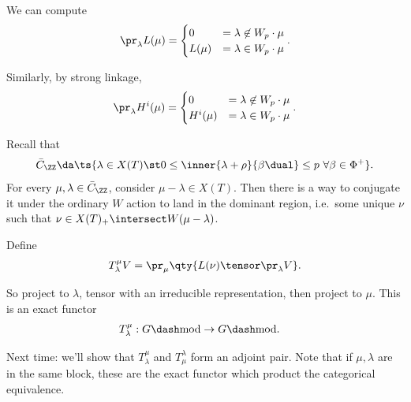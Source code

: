 \begin{example}

We can compute
\begin{align*}  
\pr_\lambda L(\mu) = 
\begin{cases}
0 &= \lambda \not\in W_p \cdot \mu \\
L(\mu) &= \lambda \in W_p \cdot \mu
\end{cases}
.\end{align*}

Similarly, by strong linkage,
\begin{align*}  
\pr_\lambda H^i(\mu) =
\begin{cases}
0 &= \lambda \not\in W_p \cdot \mu \\
H^i(\mu) &= \lambda \in W_p \cdot \mu
\end{cases}
.\end{align*}

\end{example}

Recall that
\begin{align*}  
\bar{C}_\ZZ \da \ts{
\lambda \in X(T) \st
0 \leq \inner{\lambda + \rho}{\beta\dual} \leq p \,\, \forall \beta\in\Phi^+
}
.\end{align*} For every \(\mu, \lambda \in \bar{C}_\ZZ\), consider
\(\mu - \lambda \in X(T)\). Then there is a way to conjugate it under
the ordinary \(W\) action to land in the dominant region, i.e.~some
unique \(\nu\) such that \(\nu \in X(T)_+ \intersect W(\mu - \lambda)\).

\begin{definition}

Define
\begin{align*}  
T_\lambda^\mu V = 
\pr_\mu
\qty{
L(\nu) \tensor
\pr_\lambda V
}
.\end{align*}

So project to \(\lambda\), tensor with an irreducible representation,
then project to \(\mu\). This is an exact functor
\begin{align*}  
T_{\lambda}^\mu: G\dash\mathrm{mod} &\to G\dash\mathrm{mod}
.\end{align*}

\end{definition}

Next time: we'll show that \(T_\lambda^\mu\) and \(T_\mu^\lambda\) form
an adjoint pair. Note that if \(\mu, \lambda\) are in the same block,
these are the exact functor which product the categorical equivalence.

